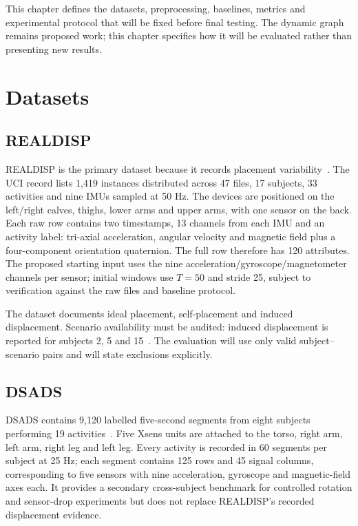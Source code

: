 \documentclass[12pt,a4paper,twoside,openright]{report}
\begin{document}
This chapter defines the datasets, preprocessing, baselines, metrics and experimental protocol that will be fixed before final testing. The dynamic graph remains proposed work; this chapter specifies how it will be evaluated rather than presenting new results.

\section{Datasets}

\subsection{REALDISP}
REALDISP is the primary dataset because it records placement variability~\cite{realdisp,banos}. The UCI record lists 1,419 instances distributed across 47 files, 17 subjects, 33 activities and nine IMUs sampled at 50 Hz. The devices are positioned on the left/right calves, thighs, lower arms and upper arms, with one sensor on the back. Each raw row contains two timestamps, 13 channels from each IMU and an activity label: tri-axial acceleration, angular velocity and magnetic field plus a four-component orientation quaternion. The full row therefore has 120 attributes. The proposed starting input uses the nine acceleration/gyroscope/magnetometer channels per sensor; initial windows use $T=50$ and stride 25, subject to verification against the raw files and baseline protocol.

The dataset documents ideal placement, self-placement and induced displacement. Scenario availability must be audited: induced displacement is reported for subjects 2, 5 and 15~\cite{banos}. The evaluation will use only valid subject--scenario pairs and will state exclusions explicitly.

\subsection{DSADS}
DSADS contains 9,120 labelled five-second segments from eight subjects performing 19 activities~\cite{dsads}. Five Xsens units are attached to the torso, right arm, left arm, right leg and left leg. Every activity is recorded in 60 segments per subject at 25 Hz; each segment contains 125 rows and 45 signal columns, corresponding to five sensors with nine acceleration, gyroscope and magnetic-field axes each. It provides a secondary cross-subject benchmark for controlled rotation and sensor-drop experiments but does not replace REALDISP's recorded displacement evidence.
\end{document}
